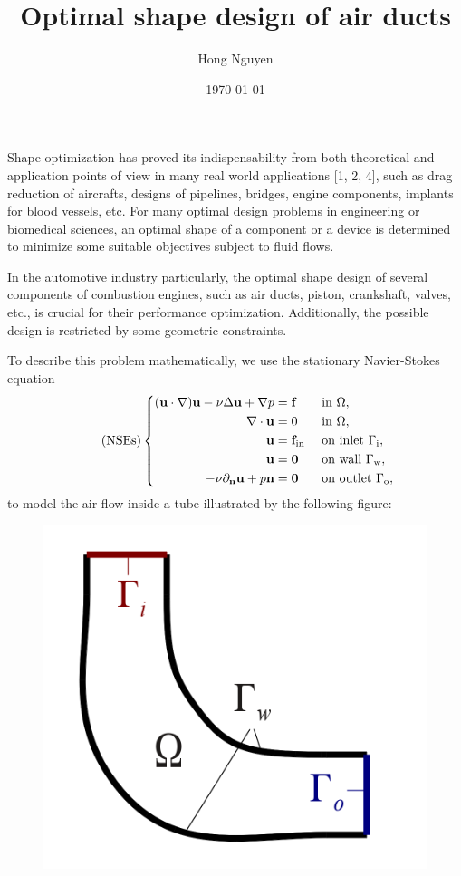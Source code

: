 \documentclass{article}
\title{Optimal shape design of air ducts}
\author{Hong Nguyen}
\date{\today}
\numberwithin{equation}{section}
\begin{document}
\maketitle

Shape optimization has proved its indispensability from both theoretical and application points of view in many real world applications [1, 2, 4], such as drag reduction of aircrafts, designs of pipelines, bridges, engine components, implants for blood vessels, etc. For many optimal design problems in engineering or biomedical sciences, an optimal shape of a component or a device is determined to minimize some suitable objectives subject to fluid flows.

In the automotive industry particularly, the optimal shape design of several components of combustion engines, such as air ducts, piston, crankshaft, valves, etc., is crucial for their performance optimization. Additionally, the possible design is restricted by some geometric constraints.

To describe this problem mathematically, we use the stationary Navier-Stokes equation
\begin{equation}
\tag{NSEs}
\left\{\begin{split}
({\bf u}\cdot\nabla){\bf u} - \nu\Delta{\bf u} + \nabla p &= {\bf f} &&\mbox{ in } \Omega,\\
\nabla\cdot{\bf u} &= 0 &&\mbox{ in } \Omega,\\
{\bf u} &= {\bf f}_{\rm in} &&\mbox{ on inlet } \Gamma_{\rm i},\\
{\bf u} &= {\bf 0} &&\mbox{ on wall } \Gamma_{\rm w},\\
-\nu\partial_{\bf n}{\bf u} + p{\bf n} &= {\bf 0} &&\mbox{ on outlet } \Gamma_{\rm o},
\end{split}\right.
\end{equation}
to model the air flow inside a tube illustrated by the following figure:
\begin{figure}[h]
    \centering
    \includegraphics[scale=0.5]{geometrie_skizze_simple}
\end{figure}
\end{document}
